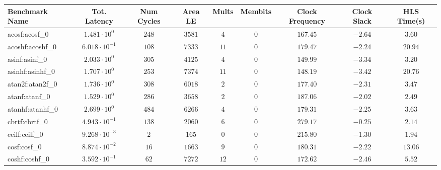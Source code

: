 \begin{tabular}{|l|c|c|c|c|c|c|c|c|}
\hline
Benchmark Name               & Tot. Latency            & Num Cycles & Area LE    & Mults   & Membits & Clock Frequency & Clock Slack & HLS Time(s) \\
\hline
acosf:acosf\_0               & $ 1.481 \cdot 10^{0}  $ & $ 248    $ & $ 3581   $ & $ 4   $ & $ 0   $ & $ 167.45      $ & $ -2.64   $ & $ 3.60    $ \\
acoshf:acoshf\_0             & $ 6.018 \cdot 10^{-1} $ & $ 108    $ & $ 7333   $ & $ 11  $ & $ 0   $ & $ 179.47      $ & $ -2.24   $ & $ 20.94   $ \\
asinf:asinf\_0               & $ 2.033 \cdot 10^{0}  $ & $ 305    $ & $ 4125   $ & $ 4   $ & $ 0   $ & $ 149.99      $ & $ -3.34   $ & $ 3.20    $ \\
asinhf:asinhf\_0             & $ 1.707 \cdot 10^{0}  $ & $ 253    $ & $ 7374   $ & $ 11  $ & $ 0   $ & $ 148.19      $ & $ -3.42   $ & $ 20.76   $ \\
atan2f:atan2f\_0             & $ 1.736 \cdot 10^{0}  $ & $ 308    $ & $ 6018   $ & $ 2   $ & $ 0   $ & $ 177.40      $ & $ -2.31   $ & $ 3.47    $ \\
atanf:atanf\_0               & $ 1.529 \cdot 10^{0}  $ & $ 286    $ & $ 3658   $ & $ 2   $ & $ 0   $ & $ 187.06      $ & $ -2.02   $ & $ 2.49    $ \\
atanhf:atanhf\_0             & $ 2.699 \cdot 10^{0}  $ & $ 484    $ & $ 6266   $ & $ 4   $ & $ 0   $ & $ 179.31      $ & $ -2.25   $ & $ 3.63    $ \\
cbrtf:cbrtf\_0               & $ 4.943 \cdot 10^{-1} $ & $ 138    $ & $ 2060   $ & $ 6   $ & $ 0   $ & $ 279.17      $ & $ -0.25   $ & $ 2.14    $ \\
ceilf:ceilf\_0               & $ 9.268 \cdot 10^{-3} $ & $ 2      $ & $ 165    $ & $ 0   $ & $ 0   $ & $ 215.80      $ & $ -1.30   $ & $ 1.94    $ \\
cosf:cosf\_0                 & $ 8.874 \cdot 10^{-2} $ & $ 16     $ & $ 1663   $ & $ 9   $ & $ 0   $ & $ 180.31      $ & $ -2.22   $ & $ 13.06   $ \\
coshf:coshf\_0               & $ 3.592 \cdot 10^{-1} $ & $ 62     $ & $ 7272   $ & $ 12  $ & $ 0   $ & $ 172.62      $ & $ -2.46   $ & $ 5.52    $ \\

\end{tabular}
